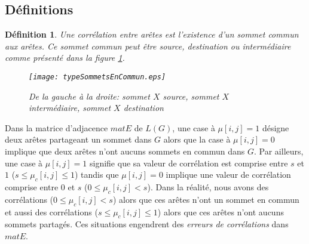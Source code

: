 \documentclass[onecolumn, 12pt]{book}
\newtheorem{definition}{D\'efinition}
\begin{document}
\subsection{D\'efinitions}

\begin{definition}
Une corr\'elation entre ar\^etes est l'existence d'un sommet commun aux ar\^etes. 
Ce sommet commun peut \^etre source, destination ou interm\'ediaire comme pr\'esent\'e dans la figure \ref{typeSommetEnCommun}.
\begin{centering} 
\begin{figure}[htb!] 
\texttt{[image: typeSommetsEnCommun.eps]}
\caption{De la gauche \`a la droite: sommet $X$ source, sommet $X$ interm\'ediaire, sommet $X$ destination}
\label{typeSommetEnCommun} 
\end{figure}
\end{centering} 
\end{definition}
Dans la matrice d'adjacence $matE$ de $L(G)$, une case \`a $\mu[i,j] = 1$ d\'esigne deux ar\^etes partageant un sommet dans $G$ alors que la case \`a $\mu[i,j] = 0$ implique que deux ar\^etes n'ont aucuns sommets en commun dans $G$. 
\newline
Par ailleurs, une case \`a $\mu[i,j] = 1$ signifie que sa valeur de corr\'elation  est comprise entre $s$ et $1$ ($s \le \mu_c[i,j] \le 1$) tandis que $\mu[i,j] = 0$ implique une valeur de corr\'elation comprise entre $0$ et $s$ ($0 \le \mu_c[i,j] < s$). 
Dans la r\'ealit\'e, nous avons des corr\'elations ($0 \le \mu_c[i,j] < s$) alors que ces ar\^etes n'ont un sommet en commun et aussi des corr\'elations  ($s \le \mu_c[i,j] \le 1$) alors que ces ar\^etes n'ont aucuns sommets partag\'es. Ces situations engendrent des {\em erreurs de corr\'elations} dans $matE$.
\end{document}
